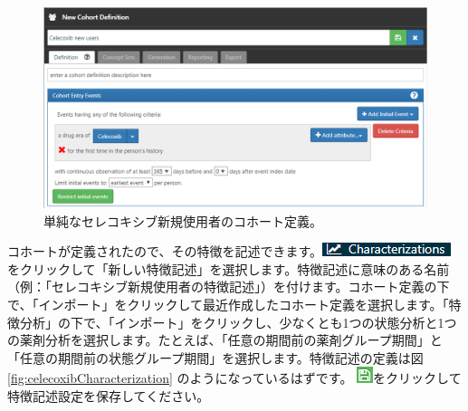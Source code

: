 \documentclass[
  11pt]{book}
\theoremstyle{definition}
\theoremstyle{definition}
\theoremstyle{definition}
\theoremstyle{definition}
\theoremstyle{remark}
\begin{document}
\begin{figure}

{\centering \includegraphics[width=1\linewidth]{images/SuggestedAnswers/celecoxibCohortDefinition} 

}

\caption{単純なセレコキシブ新規使用者のコホート定義。}\label{fig:celecoxibCohortDefinition}
\end{figure}

コホートが定義されたので、その特徴を記述できます。\includegraphics{images/Characterization/atlasCharacterizationMenuItem.png}をクリックして「新しい特徴記述」を選択します。特徴記述に意味のある名前（例：「セレコキシブ新規使用者の特徴記述」）を付けます。コホート定義の下で、「インポート」をクリックして最近作成したコホート定義を選択します。「特徴分析」の下で、「インポート」をクリックし、少なくとも1つの状態分析と1つの薬剤分析を選択します。たとえば、「任意の期間前の薬剤グループ期間」と「任意の期間前の状態グループ期間」を選択します。特徴記述の定義は図 \ref{fig:celecoxibCharacterization} のようになっているはずです。 \includegraphics{images/Cohorts/save.png}をクリックして特徴記述設定を保存してください。
\end{document}
